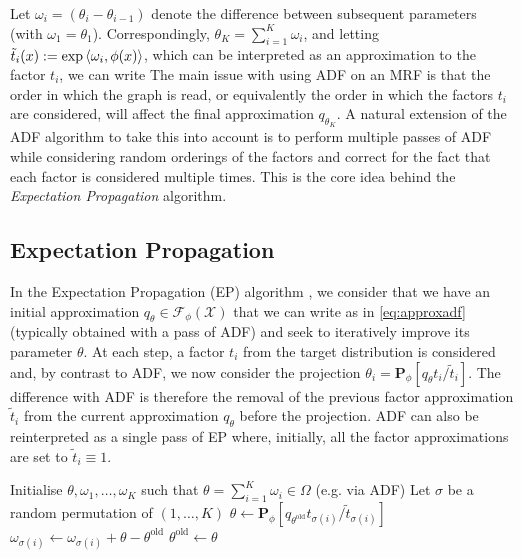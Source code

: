Let $\omega_{i}=(\theta_{i}-\theta_{i-1})$ denote the difference between subsequent parameters (with $\omega_{1}=\theta_{1}$). Correspondingly, $\theta_{K}=\sum_{i=1}^{K}\omega_{i}$, and letting $\tilde t_{i}(x):=\exp\left\langle \omega_{i},\phi(x) \right\rangle$, which can be interpreted as an approximation to the factor $t_{i}$, we can write 
%
% 
The main issue with using ADF on an MRF is that the order in which the graph is read, or equivalently the order in which the factors $t_{i}$ are considered, will affect the final approximation $q_{\theta_{K}}$. A natural extension of the ADF algorithm to take this into account is to perform multiple passes of ADF while considering random orderings of the factors and correct for the fact that each factor is considered multiple times. This is the core idea behind the \emph{Expectation Propagation} algorithm.
%
\subsection{\label{point:EP}Expectation Propagation}
%
In the Expectation Propagation (EP) algorithm \citep{minka01, minka01b, seeger07, gelman14}, we consider that we have an initial approximation $q_{\theta}\in\mathcal F_{\phi}(\mathcal X)$ that we can write as in \eqref{eq:approxadf} (typically obtained with a pass of ADF) and seek to iteratively improve its parameter $\theta$. At each step, a factor $t_{i}$ from the target distribution is considered and, by contrast to ADF, we now consider the projection $\theta_{i}=\mathbf P_{\phi}[q_{\theta}t_{i}/\tilde t_{i}]$. The difference with ADF is therefore the removal of the previous factor approximation $\tilde t_{i}$ from the current approximation $q_{\theta}$ before the projection. ADF can also be reinterpreted as a single pass of EP where, initially, all the factor approximations are set to $\tilde t_{i}\equiv 1$.

\begin{algorithm}[!h]\small
	\caption{\label{alg:ep}}
	\begin{algorithmic}[1]
	\State Initialise $\theta,\omega_{1},\dots,\omega_{K}$ such that $\theta=\sum_{i=1}^{K}\omega_{i} \in \Omega$ (e.g. via ADF)
		\State Let $\sigma$ be a random permutation of $(1,\dots,K)$
    		\State $\theta \leftarrow \mathbf P_{\phi}[q_{\theta^{\text{old}}}t_{\sigma(i)}/\tilde t_{\sigma(i)}]$
    		\State $\omega_{\sigma(i)} \leftarrow \omega_{\sigma(i)} + \theta-\theta^{\text{old}}$
			\State $\theta^{\text{old}} \leftarrow \theta$
		\EndFor
	\EndFor\\	
	\Return{$\theta$}
	\end{algorithmic}
\end{algorithm} 

